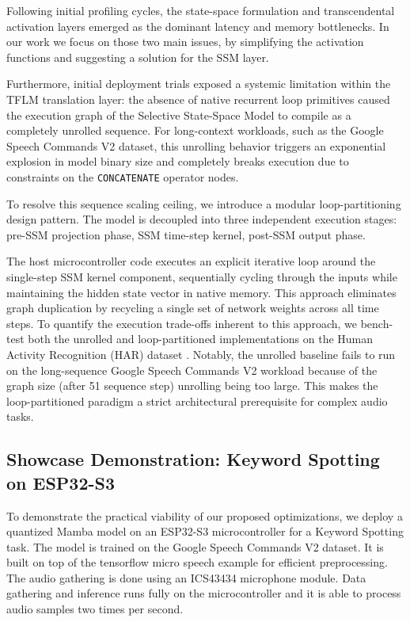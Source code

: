 Following initial profiling cycles, the state-space formulation and transcendental activation layers emerged as the dominant latency and memory bottlenecks. In our work we focus on those two main issues, by simplifying the activation functions and suggesting a solution for the SSM layer.

Furthermore, initial deployment trials exposed a systemic limitation within the TFLM translation layer: the absence of native recurrent loop primitives caused the execution graph of the Selective State-Space Model to compile as a completely unrolled sequence. For long-context workloads, such as the Google Speech Commands V2 dataset, this unrolling behavior triggers an exponential explosion in model binary size and completely breaks execution due to constraints on the \texttt{CONCATENATE} operator nodes.

To resolve this sequence scaling ceiling, we introduce a modular loop-partitioning design pattern. The model is decoupled into three independent execution stages: pre-SSM projection phase, SSM time-step kernel, post-SSM output phase.

The host microcontroller code executes an explicit iterative loop around the single-step SSM kernel component, sequentially cycling through the inputs while maintaining the hidden state vector in native memory. This approach eliminates graph duplication by recycling a single set of network weights across all time steps. To quantify the execution trade-offs inherent to this approach, we bench-test both the unrolled and loop-partitioned implementations on the Human Activity Recognition (HAR) dataset \cite{anguitaPublicDomainDataset2013}. Notably, the unrolled baseline fails to run on the long-sequence Google Speech Commands V2 \cite{speechcommandsv2} workload because of the graph size (after 51 sequence step) unrolling being too large. This makes the loop-partitioned paradigm a strict architectural prerequisite for complex audio tasks.

\subsection{Showcase Demonstration: Keyword Spotting on ESP32-S3}

To demonstrate the practical viability of our proposed optimizations, we deploy a quantized Mamba model on an ESP32-S3 microcontroller for a Keyword Spotting task. The model is trained on the Google Speech Commands V2 dataset. It is built on top of the tensorflow micro speech example for efficient preprocessing. The audio gathering is done using an ICS43434 microphone module. Data gathering and inference runs fully on the microcontroller and it is able to process audio samples two times per second.
